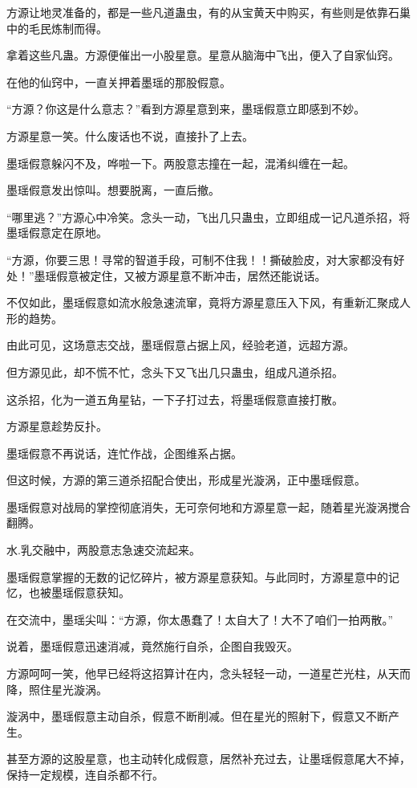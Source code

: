 \begin{this_body}
方源让地灵准备的，都是一些凡道蛊虫，有的从宝黄天中购买，有些则是依靠石巢中的毛民炼制而得。

拿着这些凡蛊。方源便催出一小股星意。星意从脑海中飞出，便入了自家仙窍。

在他的仙窍中，一直关押着墨瑶的那股假意。

“方源？你这是什么意志？”看到方源星意到来，墨瑶假意立即感到不妙。

方源星意一笑。什么废话也不说，直接扑了上去。

墨瑶假意躲闪不及，哗啦一下。两股意志撞在一起，混淆纠缠在一起。

墨瑶假意发出惊叫。想要脱离，一直后撤。

“哪里逃？”方源心中冷笑。念头一动，飞出几只蛊虫，立即组成一记凡道杀招，将墨瑶假意定在原地。

“方源，你要三思！寻常的智道手段，可制不住我！！撕破脸皮，对大家都没有好处！”墨瑶假意被定住，又被方源星意不断冲击，居然还能说话。

不仅如此，墨瑶假意如流水般急速流窜，竟将方源星意压入下风，有重新汇聚成人形的趋势。

由此可见，这场意志交战，墨瑶假意占据上风，经验老道，远超方源。

但方源见此，却不慌不忙，念头下又飞出几只蛊虫，组成凡道杀招。

这杀招，化为一道五角星钻，一下子打过去，将墨瑶假意直接打散。

方源星意趁势反扑。

墨瑶假意不再说话，连忙作战，企图维系占据。

但这时候，方源的第三道杀招配合使出，形成星光漩涡，正中墨瑶假意。

墨瑶假意对战局的掌控彻底消失，无可奈何地和方源星意一起，随着星光漩涡搅合翻腾。

水.乳交融中，两股意志急速交流起来。

墨瑶假意掌握的无数的记忆碎片，被方源星意获知。与此同时，方源星意中的记忆，也被墨瑶假意获知。

在交流中，墨瑶尖叫：“方源，你太愚蠢了！太自大了！大不了咱们一拍两散。”

说着，墨瑶假意迅速消减，竟然施行自杀，企图自我毁灭。

方源呵呵一笑，他早已经将这招算计在内，念头轻轻一动，一道星芒光柱，从天而降，照住星光漩涡。

漩涡中，墨瑶假意主动自杀，假意不断削减。但在星光的照射下，假意又不断产生。

甚至方源的这股星意，也主动转化成假意，居然补充过去，让墨瑶假意尾大不掉，保持一定规模，连自杀都不行。


\end{this_body}

